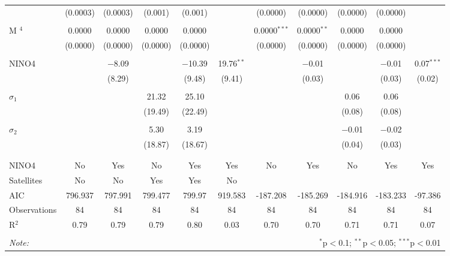 \documentclass[12pt]{article}
\begin{document}
\begin{landscape}
\begin{table}[H]
\begin{tabular}{@{\extracolsep{0.1pt}}lcccccccccc}
  & (0.0003) & (0.0003) & (0.001) & (0.001) &  & (0.0000) & (0.0000) & (0.0000) & (0.0000) &  \\ 
  & & & & & & & & & & \\ 
 M $^4$ & 0.0000 & 0.0000 & 0.0000 & 0.0000 &  & 0.0000$^{***}$ & 0.0000$^{**}$ & 0.0000 & 0.0000 &  \\ 
  & (0.0000) & (0.0000) & (0.0000) & (0.0000) &  & (0.0000) & (0.0000) & (0.0000) & (0.0000) &  \\ 
  & & & & & & & & & & \\ 
 NINO4 &  & $-$8.09 &  & $-$10.39 & 19.76$^{**}$ &  & $-$0.01 &  & $-$0.01 & 0.07$^{***}$ \\ 
  &  & (8.29) &  & (9.48) & (9.41) &  & (0.03) &  & (0.03) & (0.02) \\ 
  & & & & & & & & & & \\ 
 $\sigma_1$ &  &  & 21.32 & 25.10 &  &  &  & 0.06 & 0.06 &  \\ 
  &  &  & (19.49) & (22.49) &  &  &  & (0.08) & (0.08) &  \\ 
  & & & & & & & & & & \\ 
 $\sigma_2$ &  &  & 5.30 & 3.19 &  &  &  & $-$0.01 & $-$0.02 &  \\ 
  &  &  & (18.87) & (18.67) &  &  &  & (0.04) & (0.03) &  \\ 
  & & & & & & & & & & \\ 
\hline \\[-1.8ex] 
NINO4 & No & Yes & No & Yes & Yes & No & Yes & No & Yes & Yes \\ 
Satellites & No & No & Yes & Yes & No &  &  &  &  &  \\ 
AIC & 796.937 & 797.991 & 799.477 & 799.97 & 919.583 & -187.208 & -185.269 & -184.916 & -183.233 & -97.386 \\ 
Observations & 84 & 84 & 84 & 84 & 84 & 84 & 84 & 84 & 84 & 84 \\ 
R$^{2}$ & 0.79 & 0.79 & 0.79 & 0.80 & 0.03 & 0.70 & 0.70 & 0.71 & 0.71 & 0.07 \\ 
\hline 
\hline \\[-1.8ex] 
\textit{Note:}  & \multicolumn{10}{r}{$^{*}$p$<$0.1; $^{**}$p$<$0.05; $^{***}$p$<$0.01} \\ 
\end{tabular} 
\end{table} 
\end{landscape}
\end{document}
